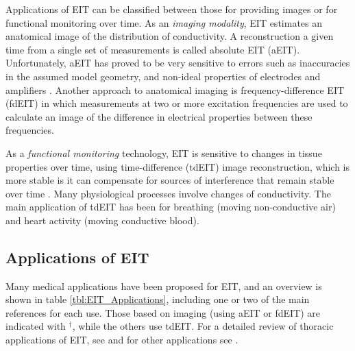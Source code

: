 \documentclass[12pt]{article} \usepackage[margin=3cm]{geometry} \usepackage[margin=20pt,font=small,labelfont=bf]{caption}\def\TBLWIDA{35mm}\def\TBLWIDB{95mm}
\begin{document}
Applications of EIT can be classified between those for
providing images or for functional monitoring over
time.
As an {\em imaging modality}, EIT estimates an anatomical
image of the distribution of conductivity. A reconstruction
a given time from a single
set of measurements is called absolute EIT (aEIT). Unfortunately,
aEIT has proved to be very sensitive to errors
such as inaccuracies in the assumed
model geometry, and non-ideal properties of electrodes
and amplifiers
 \cite{Adler2015Hard, Nissinen2009Errors}.
Another approach to anatomical imaging is frequency-difference
EIT (fdEIT) in which measurements at two or more excitation frequencies
are used to calculate an image of the difference
in electrical properties between these frequencies.

As a {\em functional monitoring} technology, EIT is sensitive
to changes in tissue properties over time, using
time-difference (tdEIT) image reconstruction, which 
is more stable 
is it can compensate for sources
of interference 
that remain stable over time \cite{Brown2003EIT}.
Many physiological processes involve 
changes of conductivity.
The main application of tdEIT 
has been for breathing (moving non-conductive
air) and heart activity (moving conductive blood).

\subsection{Applications of EIT}


Many medical applications have been proposed for EIT, and an
overview is shown in table \ref{tbl:EIT_Applications},
 including one or two of the main references for each use. 
Those based on imaging (using aEIT or fdEIT) are indicated with $^\dagger$, while
the others use tdEIT.
For a detailed review of thoracic applications of EIT, see \cite{Frerichs2017Chest} and
for other applications see \cite{Holder2004Book}.
\end{document}
